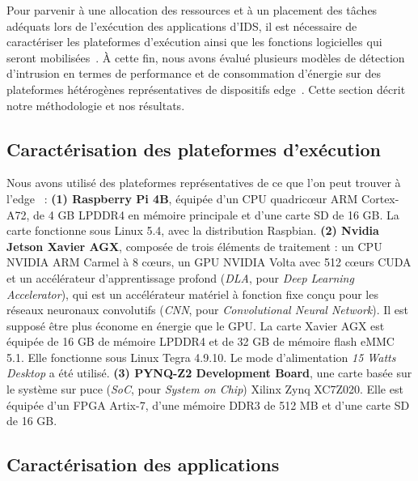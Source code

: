Pour parvenir à une allocation des ressources et à un placement des tâches adéquats lors de l'exécution des applications d'\gls{IDS}, il est nécessaire de caractériser les plateformes d'exécution ainsi que les fonctions logicielles qui seront mobilisées~\cite{mampageHolisticViewResource2022}. À cette fin, nous avons évalué plusieurs modèles de détection d'intrusion en termes de performance et de consommation d'énergie sur des plateformes hétérogènes représentatives de dispositifs edge~\cite{kljucaric2020}. Cette section décrit notre méthodologie et nos résultats.

\subsection{Caractérisation des plateformes d'exécution} \label{section:herocache-characterization-platforms}

Nous avons utilisé des plateformes représentatives de ce que l'on peut trouver à l'edge~\cite{slimani:hal-04159551,kljucaric2020} :
\textbf{(1) Raspberry Pi 4B}, équipée d'un CPU quadricœur ARM Cortex-A72, de 4 GB LPDDR4 en mémoire principale et d'une carte SD de 16 GB. La carte fonctionne sous Linux 5.4, avec la distribution Raspbian.
\textbf{(2) Nvidia Jetson Xavier AGX}, composée de trois éléments de traitement : un CPU NVIDIA ARM Carmel à 8 cœurs, un GPU NVIDIA Volta avec 512 cœurs CUDA et un accélérateur d'apprentissage profond (\textit{DLA}, pour \textit{Deep Learning Accelerator}), qui est un accélérateur matériel à fonction fixe conçu pour les réseaux neuronaux convolutifs (\textit{CNN}, pour \textit{Convolutional Neural Network}). Il est supposé être plus économe en énergie que le GPU. La carte Xavier AGX est équipée de 16 GB de mémoire LPDDR4 et de 32 GB de mémoire flash eMMC 5.1. Elle fonctionne sous Linux Tegra 4.9.10. Le mode d'alimentation \textit{15 Watts Desktop} a été utilisé.
\textbf{(3) PYNQ-Z2 Development Board}, une carte basée sur le système sur puce (\textit{SoC}, pour \textit{System on Chip}) Xilinx Zynq XC7Z020. Elle est équipée d'un FPGA Artix-7, d'une mémoire DDR3 de 512 MB et d'une carte SD de 16 GB.

\subsection{Caractérisation des applications}
\label{section:herocache-characterization-workloads}

